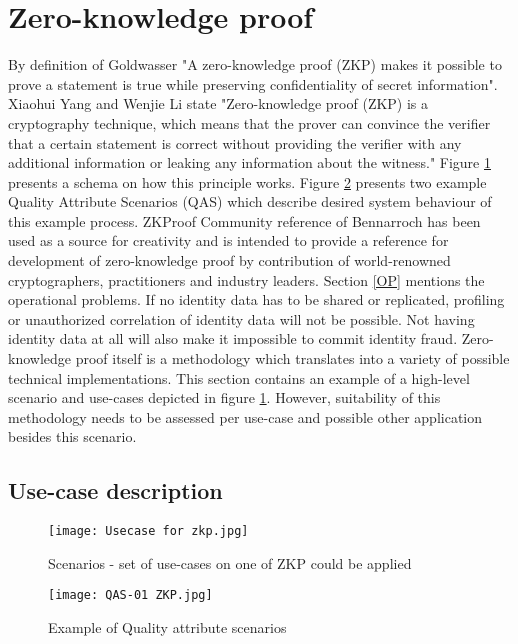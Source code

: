\section{Zero-knowledge proof}
By definition of Goldwasser \etal \cite{Goldwasser} "A zero-knowledge proof (ZKP) makes it possible to prove a statement is true while preserving confidentiality of secret information". 
Xiaohui Yang and Wenjie Li \cite{YANG2020102050} state "Zero-knowledge proof (ZKP) is a cryptography technique, which means that the prover can convince the verifier that a certain statement is correct without providing the verifier with any additional information or leaking any information about the witness." Figure \ref{fig:ZKP_usecase} presents a schema on how this principle works. Figure \ref{fig:QAS01} presents two example Quality Attribute Scenarios (QAS) which describe desired system behaviour of this example process. ZKProof Community reference \cite{2019:zkproof:community-reference-0.2} of Bennarroch \etal has been used as a source for creativity and is intended to provide a reference for development of zero-knowledge proof by contribution of world-renowned cryptographers, practitioners and industry leaders. Section \ref{OP} mentions the operational problems. If no identity data has to be shared or replicated, profiling or unauthorized correlation of identity data will not be possible. Not having identity data at all will also make it impossible to commit identity fraud. 
Zero-knowledge proof itself is a methodology which translates into a variety of possible technical implementations. This section contains an example of a high-level scenario and use-cases depicted in figure \ref{fig:ZKP_usecase}. However, suitability of this methodology needs to be assessed per use-case and possible other application besides this scenario. 

\subsection{Use-case description}\label{UC_description}
    
    \begin{figure}
    \graphicspath{ {./images/} }
        \texttt{[image: Usecase for zkp.jpg]}\\
        \centering
        \caption{Scenarios - set of use-cases on one of ZKP could be applied}
        \label{fig:ZKP_usecase}
    \end{figure}


    \begin{figure}
        \graphicspath{ {./images/} }
        \centering
        \texttt{[image: QAS-01 ZKP.jpg]}\\
        \caption{Example of Quality attribute scenarios}
        \label{fig:QAS01}
    \end{figure}

